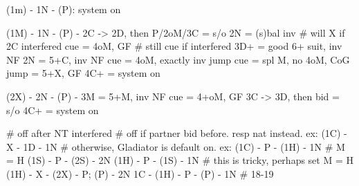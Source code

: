 (1m) - 1N - (P): system on

(1M) - 1N - (P) -
2C -> 2D, then
    P/2oM/3C = s/o
    2N = (s)bal inv  # will X if 2C interfered
    cue = 4oM, GF  # still cue if interfered
    3D+ = good 6+ suit, inv NF
2N = 5+C, inv NF
cue = 4oM, exactly inv
jump cue = spl M, no 4oM, CoG
jump = 5+X, GF
4C+ = system on

(2X) - 2N - (P) -
3M = 5+M, inv NF
cue = 4+oM, GF
3C -> 3D, then bid = s/o
4C+ = system on

# off after NT interfered
# off if partner bid before. resp nat instead. ex: (1C) - X - 1D - 1N
# otherwise, Gladiator is default on. ex:
(1C) - P - (1H) - 1N  # M = H
(1S) - P - (2S) - 2N
(1H) - P - (1S) - 1N  # this is tricky, perhaps set M = H
(1H) - X - (2X) - P; (P) - 2N
1C - (1H) - P - (P) - 1N  # 18-19